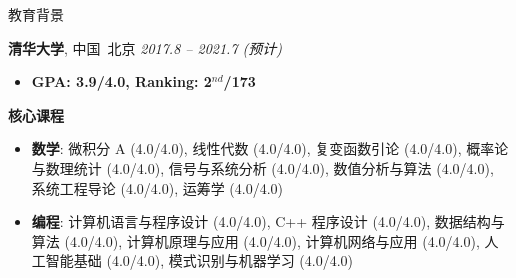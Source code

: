 \documentclass{resume} %
\begin{document}

\begin{rSection}{教育背景}

{\textbf{清华大学}, 中国\ 北京} \hfill {\em 2017.8 -- 2021.7 (预计)}
\begin{itemize}
    信息学院\ 自动化系\ \textbf{工程学士学位} (预计)
    \item \textbf{GPA: 3.9/4.0, Ranking: 2$^{nd}$/173}
\end{itemize}

\textbf{核心课程}
\begin{itemize}
    \item \textbf{数学}: 微积分 A (4.0/4.0), 
    线性代数 (4.0/4.0), 
    复变函数引论 (4.0/4.0), 
    概率论与数理统计 (4.0/4.0), 
    信号与系统分析 (4.0/4.0), 
    数值分析与算法 (4.0/4.0), 
    系统工程导论 (4.0/4.0), 
    运筹学 (4.0/4.0)
    \item \textbf{编程}: 计算机语言与程序设计 (4.0/4.0), 
    C++ 程序设计 (4.0/4.0), 
    数据结构与算法 (4.0/4.0), 
    计算机原理与应用 (4.0/4.0), 
    计算机网络与应用 (4.0/4.0), 
    人工智能基础 (4.0/4.0), 
    模式识别与机器学习 (4.0/4.0)\newline
\end{itemize}

\end{rSection}
\end{document}
